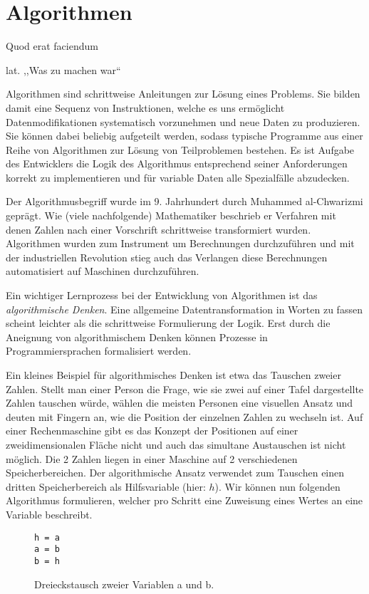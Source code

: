 \chapter{Algorithmen}
\epigraph{Quod erat faciendum}{lat. ,,Was zu machen war``}
%
Algorithmen sind schrittweise Anleitungen zur Lösung eines Problems. Sie bilden damit eine Sequenz von Instruktionen, welche es uns ermöglicht Datenmodifikationen systematisch vorzunehmen und neue Daten zu produzieren. Sie können dabei beliebig aufgeteilt werden, sodass typische Programme aus einer Reihe von Algorithmen zur Lösung von Teilproblemen bestehen. Es ist Aufgabe des Entwicklers die Logik des Algorithmus entsprechend seiner Anforderungen korrekt zu implementieren und für variable Daten alle Spezialfälle abzudecken.

Der Algorithmusbegriff wurde im 9. Jahrhundert durch Muhammed al-Chwarizmi geprägt. Wie (viele nachfolgende) Mathematiker beschrieb er Verfahren mit denen Zahlen nach einer Vorschrift schrittweise transformiert wurden. Algorithmen wurden zum Instrument um Berechnungen durchzuführen und mit der industriellen Revolution stieg auch das Verlangen diese Berechnungen automatisiert auf Maschinen durchzuführen.

Ein wichtiger Lernprozess bei der Entwicklung von Algorithmen ist das \emph{algorithmische Denken}. Eine allgemeine Datentransformation in Worten zu fassen scheint leichter als die schrittweise Formulierung der Logik. Erst durch die Aneignung von algorithmischem Denken können Prozesse in Programmiersprachen formalisiert werden.

Ein kleines Beispiel für algorithmisches Denken ist etwa das Tauschen zweier Zahlen. Stellt man einer Person die Frage, wie sie zwei auf einer Tafel dargestellte Zahlen tauschen würde, wählen die meisten Personen eine visuellen Ansatz und deuten mit Fingern an, wie die Position der einzelnen Zahlen zu wechseln ist. Auf einer Rechenmaschine gibt es das Konzept der Positionen auf einer zweidimensionalen Fläche nicht und auch das simultane Austauschen ist nicht möglich. Die 2 Zahlen liegen in einer Maschine auf 2 verschiedenen Speicherbereichen. Der algorithmische Ansatz verwendet zum Tauschen einen dritten Speicherbereich als Hilfsvariable (hier: $h$). Wir können nun folgenden Algorithmus formulieren, welcher pro Schritt eine Zuweisung eines Wertes an eine Variable beschreibt.
%
\begin{figure}[ht]
 \begin{center}
  \texttt{h = a} \\
  \texttt{a = b} \\
  \texttt{b = h}
  \caption{Dreieckstausch zweier Variablen a und b.}
 \end{center}
\end{figure}

